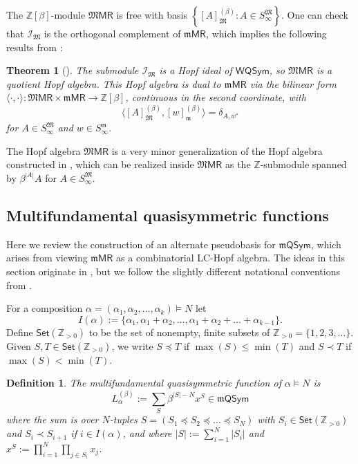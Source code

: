 \documentclass[11pt]{article}
\newtheorem{definition}[theo]{Definition}
\newtheorem{theorem}[theo]{Theorem}
\theoremstyle{definition}
\numberwithin{equation}{section}
\numberwithin{equation}{section}
\newcommand{\cI}{\mathcal{I}}
\newcommand{\ZZ}{\mathbb{Z}}
\newcommand{\fk}{\mathfrak}
\newcommand{\MMPR}{\mathfrak{M}\mathsf{MR}}
\newcommand{\mMPR}{\mathfrak{m}\mathsf{MR}}
\newcommand{\MWQSym}{\mathsf{WQSym}}
\newcommand{\PSet}{\mathsf{Set}(\PP)}
\newcommand{\mQSym}{\mathfrak{m}\mathsf{QSym}}
\newcommand{\Sm}{S^{\fk m}}
\newcommand{\SM}{S^{\fk M}}
\newcommand{\m}{\mathfrak{m}}
\newcommand{\M}{\mathfrak{M}}
\newcommand{\cJM}{\cI_\M}
\newcommand{\PP}{\ZZ_{>0}}
\newcommand{\defn}[1]{{\color{darkred}\emph{#1}}}
\begin{document}
The $\ZZ[\beta]$-module $\MMPR$ is free  with 
 basis  $\left\{[A]^{(\beta)}_\M: A \in \SM_\infty\right\}$.
One can check that $\cJM$ is the orthogonal complement of $\mMPR$,
which
implies the following results from \cite[\S7.2 and \S7.4]{LamPyl}:

\begin{theorem}[{\cite{LamPyl}}]
\label{form2-thm}
The submodule $\cJM$ is a Hopf ideal of $\MWQSym$,
so $\MMPR$ is a quotient Hopf algebra.
This Hopf algebra is dual to $\mMPR$ via 
the bilinear form
$\langle\cdot,\cdot\rangle : \MMPR \times \mMPR\to \ZZ[\beta]$, 
continuous in the second coordinate, with
\[
\langle [A]^{(\beta)}_\M, [w]^{(\beta)}_\m \rangle = \delta_{A,w^*}
\]
for $A \in \SM_\infty$ and $w\in \Sm_\infty.$
\end{theorem}




The Hopf algebra $\MMPR$ is a very minor generalization of the Hopf algebra constructed in \cite[Thm.~7.5]{LamPyl},
which can be realized inside $\MMPR$ as the $\ZZ$-submodule 
spanned by $  \beta^{|A|} A$ for $A \in \SM_\infty$.




 


 

\subsection{Multifundamental quasisymmetric functions}


Here we review the construction   of an alternate pseudobasis for $\mQSym$,
which arises from viewing $\mMPR$ as a combinatorial LC-Hopf algebra.
The ideas in this section originate in \cite[\S5]{LamPyl}, but we follow the slightly different notational
conventions from \cite[\S3]{LM2019}.
 
For a composition $\alpha=(\alpha_1,\alpha_2,\dots,\alpha_k)\vDash N$
let 
\[
I(\alpha) := \{\alpha_1, \alpha_1+\alpha_2,\dots, \alpha_1+\alpha_2 + \dots + \alpha_{k-1}\}
.\]
Define $\PSet$ to be the set of nonempty, finite subsets of $\PP=\{1,2,3,\dots\}$. 
Given $S,T \in \PSet$, we write $S\preceq T$ if $\max(S) \leq \min(T)$ and $S \prec T$ if $\max(S) < \min(T)$.
\begin{definition}
\label{lbeta-def}
The \defn{multifundamental quasisymmetric function} of $\alpha\vDash N$ is  
\[
 L^{(\beta)}_\alpha   := \sum_S
\beta^{|S| - N} x^S
\in \mQSym
\] where 
the sum is over $N$-tuples $S=(S_1 \preceq S_2 \preceq \dots \preceq S_N)$ with $S_i \in \PSet$
and $S_i \prec S_{i+1}$ if $i \in I(\alpha)$, and where
$|S| := \sum_{i=1}^N |S_i|$ and $x^S := \prod_{i=1}^N \prod_{j \in S_i} x_{j}$.
\end{definition}
\end{document}
